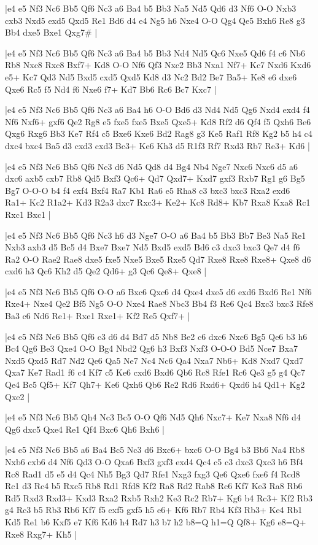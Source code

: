 \whitename{}
\blackname{}
\makegametitle
|e4 e5 Nf3 Nc6 Bb5 Qf6 Nc3 a6 Ba4 b5 Bb3 Na5 Nd5 Qd6 d3 Nf6 O-O Nxb3 cxb3 Nxd5 exd5 Qxd5 Re1 Bd6 d4 e4 Ng5 h6 Nxe4 O-O Qg4 Qe5 Bxh6 Re8 g3 Bb4 dxe5 Bxe1 Qxg7\#  |

\whitename{}
\blackname{}
\makegametitle
|e4 e5 Nf3 Nc6 Bb5 Qf6 Nc3 a6 Ba4 b5 Bb3 Nd4 Nd5 Qc6 Nxe5 Qd6 f4 c6 Nb6 Rb8 Nxc8 Rxc8 Bxf7+ Kd8 O-O Nf6 Qf3 Nxc2 Bb3 Nxa1 Nf7+ Kc7 Nxd6 Kxd6 e5+ Kc7 Qd3 Nd5 Bxd5 cxd5 Qxd5 Kd8 d3 Nc2 Bd2 Be7 Ba5+ Ke8 e6 dxe6 Qxe6 Rc5 f5 Nd4 f6 Nxe6 f7+ Kd7 Bb6 Rc6 Bc7 Kxc7  |

\whitename{}
\blackname{}
\makegametitle
|e4 e5 Nf3 Nc6 Bb5 Qf6 Nc3 a6 Ba4 h6 O-O Bd6 d3 Nd4 Nd5 Qg6 Nxd4 exd4 f4 Nf6 Nxf6+ gxf6 Qe2 Rg8 e5 fxe5 fxe5 Bxe5 Qxe5+ Kd8 Rf2 d6 Qf4 f5 Qxh6 Be6 Qxg6 Rxg6 Bb3 Ke7 Rf4 c5 Bxe6 Kxe6 Bd2 Rag8 g3 Ke5 Raf1 Rf8 Kg2 b5 h4 c4 dxc4 bxc4 Ba5 d3 cxd3 cxd3 Bc3+ Ke6 Kh3 d5 R1f3 Rf7 Rxd3 Rb7 Re3+ Kd6  |

\whitename{}
\blackname{}
\makegametitle
|e4 e5 Nf3 Nc6 Bb5 Qf6 Nc3 d6 Nd5 Qd8 d4 Bg4 Nb4 Nge7 Nxc6 Nxc6 d5 a6 dxc6 axb5 cxb7 Rb8 Qd5 Bxf3 Qc6+ Qd7 Qxd7+ Kxd7 gxf3 Rxb7 Rg1 g6 Bg5 Bg7 O-O-O b4 f4 exf4 Bxf4 Ra7 Kb1 Ra6 e5 Rha8 c3 bxc3 bxc3 Rxa2 exd6 Ra1+ Kc2 R1a2+ Kd3 R2a3 dxc7 Rxc3+ Ke2+ Kc8 Rd8+ Kb7 Rxa8 Kxa8 Rc1 Rxc1 Bxc1  |

\whitename{}
\blackname{}
\makegametitle
|e4 e5 Nf3 Nc6 Bb5 Qf6 Nc3 h6 d3 Nge7 O-O a6 Ba4 b5 Bb3 Bb7 Be3 Na5 Re1 Nxb3 axb3 d5 Bc5 d4 Bxe7 Bxe7 Nd5 Bxd5 exd5 Bd6 c3 dxc3 bxc3 Qe7 d4 f6 Ra2 O-O Rae2 Rae8 dxe5 fxe5 Nxe5 Bxe5 Rxe5 Qd7 Rxe8 Rxe8 Rxe8+ Qxe8 d6 cxd6 h3 Qc6 Kh2 d5 Qe2 Qd6+ g3 Qc6 Qe8+ Qxe8  |

\whitename{}
\blackname{}
\makegametitle
|e4 e5 Nf3 Nc6 Bb5 Qf6 O-O a6 Bxc6 Qxc6 d4 Qxe4 dxe5 d6 exd6 Bxd6 Re1 Nf6 Rxe4+ Nxe4 Qe2 Bf5 Ng5 O-O Nxe4 Rae8 Nbc3 Bb4 f3 Re6 Qc4 Bxc3 bxc3 Rfe8 Ba3 c6 Nd6 Re1+ Rxe1 Rxe1+ Kf2 Re5 Qxf7+  |

\whitename{}
\blackname{}
\makegametitle
|e4 e5 Nf3 Nc6 Bb5 Qf6 c3 d6 d4 Bd7 d5 Nb8 Be2 c6 dxc6 Nxc6 Bg5 Qe6 b3 h6 Bc4 Qg6 Be3 Qxe4 O-O Bg4 Nbd2 Qg6 h3 Bxf3 Nxf3 O-O-O Bd5 Nce7 Bxa7 Nxd5 Qxd5 Rd7 Nd2 Qe6 Qa5 Ne7 Nc4 Nc6 Qa4 Nxa7 Nb6+ Kd8 Nxd7 Qxd7 Qxa7 Ke7 Rad1 f6 c4 Kf7 c5 Ke6 cxd6 Bxd6 Qb6 Rc8 Rfe1 Rc6 Qe3 g5 g4 Qc7 Qe4 Bc5 Qf5+ Kf7 Qh7+ Ke6 Qxh6 Qb6 Re2 Rd6 Rxd6+ Qxd6 h4 Qd1+ Kg2 Qxe2  |

\whitename{}
\blackname{}
\makegametitle
|e4 e5 Nf3 Nc6 Bb5 Qh4 Nc3 Bc5 O-O Qf6 Nd5 Qh6 Nxc7+ Ke7 Nxa8 Nf6 d4 Qg6 dxc5 Qxe4 Re1 Qf4 Bxc6 Qh6 Bxh6  |

\whitename{}
\blackname{}
\makegametitle
|e4 e5 Nf3 Nc6 Bb5 a6 Ba4 Bc5 Nc3 d6 Bxc6+ bxc6 O-O Bg4 b3 Bb6 Na4 Rb8 Nxb6 cxb6 d4 Nf6 Qd3 O-O Qxa6 Bxf3 gxf3 exd4 Qc4 c5 c3 dxc3 Qxc3 h6 Bf4 Rc8 Rad1 d5 e5 d4 Qc4 Nh5 Bg3 Qd7 Rfe1 Nxg3 fxg3 Qe6 Qxe6 fxe6 f4 Rcd8 Rc1 d3 Rc4 b5 Rxc5 Rb8 Rd1 Rfd8 Kf2 Ra8 Rd2 Rab8 Rc6 Kf7 Ke3 Ra8 Rb6 Rd5 Rxd3 Rxd3+ Kxd3 Rxa2 Rxb5 Rxh2 Ke3 Rc2 Rb7+ Kg6 b4 Rc3+ Kf2 Rb3 g4 Rc3 b5 Rb3 Rb6 Kf7 f5 exf5 gxf5 h5 e6+ Kf6 Rb7 Rb4 Kf3 Rb3+ Ke4 Rb1 Kd5 Re1 b6 Kxf5 e7 Kf6 Kd6 h4 Rd7 h3 b7 h2 b8=Q h1=Q Qf8+ Kg6 e8=Q+ Rxe8 Rxg7+ Kh5  |

